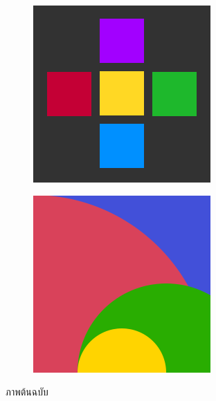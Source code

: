 \begin{figure}[H]
\begin{subfigure}{\ResultSubFigureWidth \linewidth}
    \end{subfigure}
    \begin{subfigure}{\ResultSubFigureWidth \linewidth}
        \centering
        \includegraphics[width=\ResultSubFigurePadding \linewidth]{image/image_inpaint_synthetic/case04-original.png}			
    \end{subfigure}
    \begin{subfigure}{\ResultSubFigureWidth \linewidth}
        \centering
        \includegraphics[width=\ResultSubFigurePadding \linewidth]{image/image_inpaint_synthetic/case05-original.png}			
    \end{subfigure}
    \caption{ภาพต้นฉบับ}
    \label{figure:synart_original}
\end{figure}